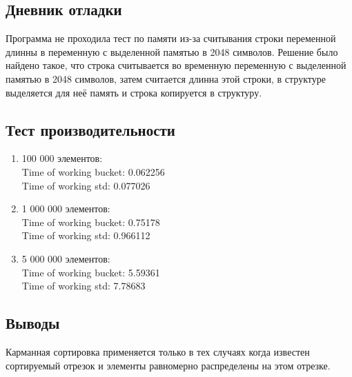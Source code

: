 \documentclass[12pt]{article}
\begin{document}
\subsection*{Дневник отладки}

Программа не проходила тест по памяти из-за считывания строки переменной длинны в переменную с выделенной памятью в 2048 символов. Решение было найдено такое, что строка считывается во временную переменную с выделенной памятью в 2048 символов, затем считается длинна этой строки, в структуре выделяется для неё память и строка копируется в структуру. 

\subsection*{Тест производительности}
\begin{enumerate}
\item 100 000 элементов: \\ Time of working bucket: 0.062256\\
Time of working std: 0.077026
\item 1 000 000 элементов: \\ Time of working bucket: 0.75178 \\
Time of working std: 0.966112
\item 5 000 000 элементов: \\ Time of working bucket: 5.59361 \\
Time of working std: 7.78683
\end{enumerate}

\subsection*{Выводы}

Карманная сортировка применяется только в тех случаях когда известен сортируемый отрезок и элементы равномерно распределены на этом отрезке.
\end{document}
